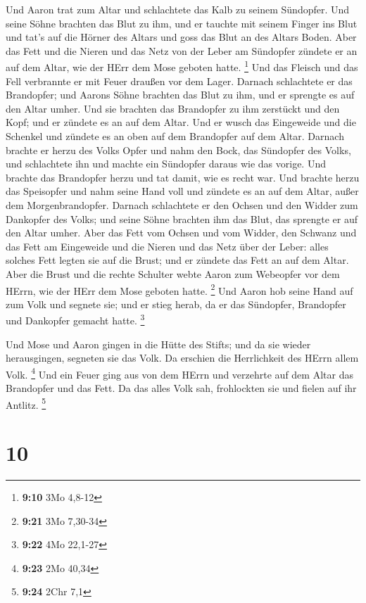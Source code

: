  Und Aaron trat zum Altar und schlachtete das Kalb zu seinem
Sündopfer.  Und seine Söhne brachten das Blut zu ihm, und er
tauchte mit seinem Finger ins Blut und tat's auf die Hörner des Altars
und goss das Blut an des Altars Boden.  Aber das Fett und
die Nieren und das Netz von der Leber am Sündopfer zündete er an auf dem
Altar, wie der HErr dem Mose geboten hatte. \footnote{\textbf{9:10} 3Mo
  4,8-12}  Und das Fleisch und das Fell verbrannte er mit
Feuer draußen vor dem Lager.  Darnach schlachtete er das
Brandopfer; und Aarons Söhne brachten das Blut zu ihm, und er sprengte
es auf den Altar umher.  Und sie brachten das Brandopfer zu
ihm zerstückt und den Kopf; und er zündete es an auf dem Altar.
 Und er wusch das Eingeweide und die Schenkel und zündete
es an oben auf dem Brandopfer auf dem Altar.  Darnach
brachte er herzu des Volks Opfer und nahm den Bock, das Sündopfer des
Volks, und schlachtete ihn und machte ein Sündopfer daraus wie das
vorige.  Und brachte das Brandopfer herzu und tat damit,
wie es recht war.  Und brachte herzu das Speisopfer und
nahm seine Hand voll und zündete es an auf dem Altar, außer dem
Morgenbrandopfer.  Darnach schlachtete er den Ochsen und
den Widder zum Dankopfer des Volks; und seine Söhne brachten ihm das
Blut, das sprengte er auf den Altar umher.  Aber das Fett
vom Ochsen und vom Widder, den Schwanz und das Fett am Eingeweide und
die Nieren und das Netz über der Leber:  alles solches Fett
legten sie auf die Brust; und er zündete das Fett an auf dem Altar.
 Aber die Brust und die rechte Schulter webte Aaron zum
Webeopfer vor dem HErrn, wie der HErr dem Mose geboten hatte.
\footnote{\textbf{9:21} 3Mo 7,30-34}  Und Aaron hob seine
Hand auf zum Volk und segnete sie; und er stieg herab, da er das
Sündopfer, Brandopfer und Dankopfer gemacht hatte. \footnote{\textbf{9:22}
  4Mo 22,1-27}

 Und Mose und Aaron gingen in die Hütte des Stifts; und da
sie wieder herausgingen, segneten sie das Volk. Da erschien die
Herrlichkeit des HErrn allem Volk. \footnote{\textbf{9:23} 2Mo 40,34}
 Und ein Feuer ging aus von dem HErrn und verzehrte auf dem
Altar das Brandopfer und das Fett. Da das alles Volk sah, frohlockten
sie und fielen auf ihr Antlitz. \footnote{\textbf{9:24} 2Chr 7,1}

\hypertarget{section-2}{%
\section{10}\label{section-2}}

